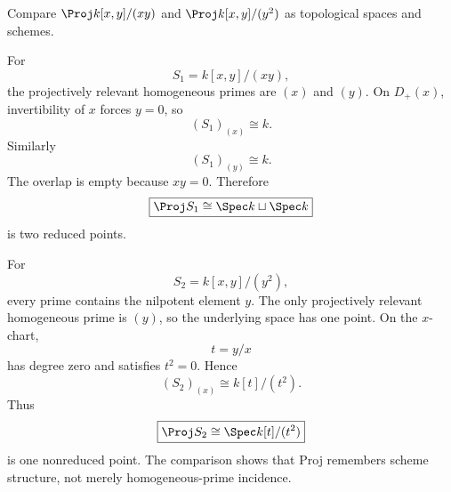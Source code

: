 \begin{problem}\label{prob:vi35-08}
Compare \(\Proj k[x,y]/(xy)\) and \(\Proj k[x,y]/(y^2)\) as topological spaces and schemes.
\end{problem}

\ifdefined\FullProblemDossiers
\begin{solution}
For
\[
S_1=k[x,y]/(xy),
\]
the projectively relevant homogeneous primes are \((x)\) and \((y)\). On \(D_+(x)\), invertibility of \(x\) forces
\(y=0\), so
\[
(S_1)_{(x)}\cong k.
\]
Similarly
\[
(S_1)_{(y)}\cong k.
\]
The overlap is empty because \(xy=0\). Therefore
\[
\boxed{\Proj S_1\cong\Spec k\sqcup\Spec k}
\]
is two reduced points.

For
\[
S_2=k[x,y]/(y^2),
\]
every prime contains the nilpotent element \(y\). The only projectively relevant homogeneous prime is \((y)\), so
the underlying space has one point. On the \(x\)-chart,
\[
t=y/x
\]
has degree zero and satisfies \(t^2=0\). Hence
\[
(S_2)_{(x)}\cong k[t]/(t^2).
\]
Thus
\[
\boxed{\Proj S_2\cong\Spec k[t]/(t^2)}
\]
is one nonreduced point. The comparison shows that Proj remembers scheme structure, not merely homogeneous-prime
incidence.
\end{solution}
\fi

